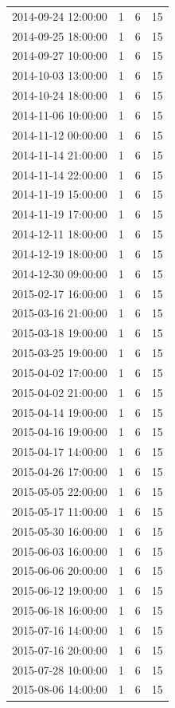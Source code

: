 \begin{tabular}{lrrr}
2014-09-24 12:00:00 & 1 & 6 & 15 \\
2014-09-25 18:00:00 & 1 & 6 & 15 \\
2014-09-27 10:00:00 & 1 & 6 & 15 \\
2014-10-03 13:00:00 & 1 & 6 & 15 \\
2014-10-24 18:00:00 & 1 & 6 & 15 \\
2014-11-06 10:00:00 & 1 & 6 & 15 \\
2014-11-12 00:00:00 & 1 & 6 & 15 \\
2014-11-14 21:00:00 & 1 & 6 & 15 \\
2014-11-14 22:00:00 & 1 & 6 & 15 \\
2014-11-19 15:00:00 & 1 & 6 & 15 \\
2014-11-19 17:00:00 & 1 & 6 & 15 \\
2014-12-11 18:00:00 & 1 & 6 & 15 \\
2014-12-19 18:00:00 & 1 & 6 & 15 \\
2014-12-30 09:00:00 & 1 & 6 & 15 \\
2015-02-17 16:00:00 & 1 & 6 & 15 \\
2015-03-16 21:00:00 & 1 & 6 & 15 \\
2015-03-18 19:00:00 & 1 & 6 & 15 \\
2015-03-25 19:00:00 & 1 & 6 & 15 \\
2015-04-02 17:00:00 & 1 & 6 & 15 \\
2015-04-02 21:00:00 & 1 & 6 & 15 \\
2015-04-14 19:00:00 & 1 & 6 & 15 \\
2015-04-16 19:00:00 & 1 & 6 & 15 \\
2015-04-17 14:00:00 & 1 & 6 & 15 \\
2015-04-26 17:00:00 & 1 & 6 & 15 \\
2015-05-05 22:00:00 & 1 & 6 & 15 \\
2015-05-17 11:00:00 & 1 & 6 & 15 \\
2015-05-30 16:00:00 & 1 & 6 & 15 \\
2015-06-03 16:00:00 & 1 & 6 & 15 \\
2015-06-06 20:00:00 & 1 & 6 & 15 \\
2015-06-12 19:00:00 & 1 & 6 & 15 \\
2015-06-18 16:00:00 & 1 & 6 & 15 \\
2015-07-16 14:00:00 & 1 & 6 & 15 \\
2015-07-16 20:00:00 & 1 & 6 & 15 \\
2015-07-28 10:00:00 & 1 & 6 & 15 \\
2015-08-06 14:00:00 & 1 & 6 & 15 \\

\end{tabular}
